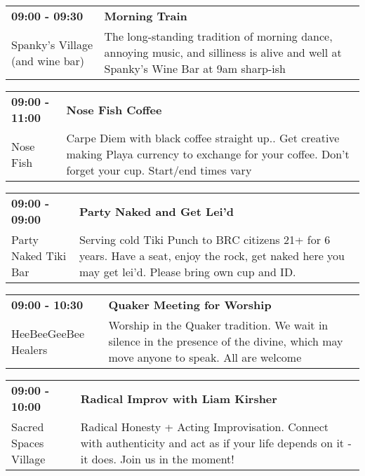 \begin{tabular}{ p{1in} p{2.2in} }
    \textbf{09:00 - 09:30} & \textbf{Morning Train} \\
    Spanky's Village (and wine bar) \newline  & The long-standing tradition of morning dance, annoying music, and silliness is alive and well at Spanky's Wine Bar at 9am sharp-ish \\
    \hline 
\end{tabular}
    
\begin{tabular}{ p{1in} p{2.2in} }
    \textbf{09:00 - 11:00} & \textbf{Nose Fish Coffee} \\
    Nose Fish \newline  & Carpe Diem with black coffee straight up.. Get creative making Playa currency to exchange for your coffee. Don't forget your cup. Start/end times vary \\
    \hline 
\end{tabular}
    
\begin{tabular}{ p{1in} p{2.2in} }
    \textbf{09:00 - 09:00} & \textbf{Party Naked and Get Lei'd} \\
    Party Naked Tiki Bar \newline  & Serving cold Tiki Punch to BRC citizens 21+ for 6 years. Have a seat, enjoy the rock, get naked here you may get lei'd. Please bring own cup and ID. \\
    \hline 
\end{tabular}
    
\begin{tabular}{ p{1in} p{2.2in} }
    \textbf{09:00 - 10:30} & \textbf{Quaker Meeting for Worship} \\
    HeeBeeGeeBee Healers \newline  & Worship in the Quaker tradition. We wait in silence in the presence of the divine, which may move anyone to speak. All are welcome \\
    \hline 
\end{tabular}
    
\begin{tabular}{ p{1in} p{2.2in} }
    \textbf{09:00 - 10:00} & \textbf{Radical Improv with Liam Kirsher} \\
    Sacred Spaces Village \newline  & Radical Honesty + Acting Improvisation. Connect with authenticity and act as if your life depends on it - it does. Join us in the moment! \\
    \hline 
\end{tabular}
    
